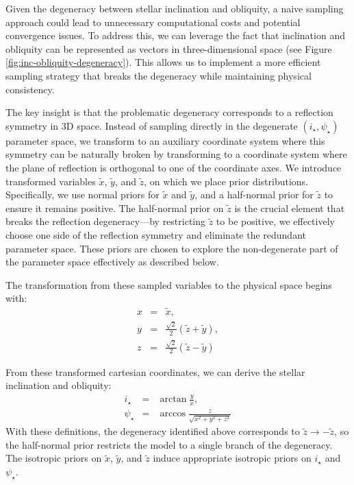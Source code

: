 \documentclass[twocolumn]{aastex631}
\newcommand{\sabinasays}[1]{{\color{purple}#1}}
\begin{document}
Given the degeneracy between stellar inclination and obliquity, a naive sampling approach could lead to unnecessary computational costs and potential 
convergence issues. To address this, we can leverage the fact that inclination and obliquity can be represented as vectors in three-dimensional 
space (see Figure \ref{fig:inc-obliquity-degeneracy}). This allows us to implement a more efficient sampling strategy that breaks the degeneracy 
while maintaining physical consistency.

\sabinasays{The key insight is that the problematic degeneracy corresponds to a reflection symmetry in 3D space. Instead of sampling directly 
in the degenerate $(i_\star, \psi_\star)$ parameter space, we transform to an auxiliary coordinate system where this symmetry can be naturally 
broken by transforming to a coordinate system where the plane of reflection is orthogonal to one of the coordinate axes. We introduce transformed variables $\tilde{x}$, $\tilde{y}$, and $\tilde{z}$, on
which we place prior distributions. Specifically, we use normal priors for
$\tilde{x}$ and $\tilde{y}$, and a half-normal prior for $\tilde{z}$ to ensure
it remains positive. The half-normal prior on $\tilde{z}$ is the crucial element that breaks the reflection degeneracy—by restricting $\tilde{z}$ to 
be positive, we effectively choose one side of the reflection symmetry and eliminate the redundant parameter space. These priors are chosen to explore the
non-degenerate part of the parameter space effectively
as described below.}


The transformation from these sampled variables to the physical space begins with:
\begin{eqnarray}
    x & = & \tilde{x}, \\ 
    y & = & \frac{\sqrt{2}}{2} (\tilde{z} + \tilde{y}), \\
    z & = & \frac{\sqrt{2}}{2} (\tilde{z} - \tilde{y})
\end{eqnarray}

From these transformed cartesian coordinates, we can derive the
stellar inclination and obliquity:
\begin{eqnarray}
    i_\star & = & \arctan{\frac{y}{x}}, \\ 
    \psi_\star & = & \arccos{\frac{z}{\sqrt{x^2 + y^2 + z^2}}}
\end{eqnarray}
With these definitions, the degeneracy identified above
corresponds to $\tilde{z} \to - \tilde{z}$, so the half-normal prior restricts
the model to a single branch of the degeneracy.  The isotropic priors on
$\tilde{x}$, $\tilde{y}$, and $\tilde{z}$ induce appropriate isotropic priors on
$i_\star$ and $\psi_\star$.
\end{document}
